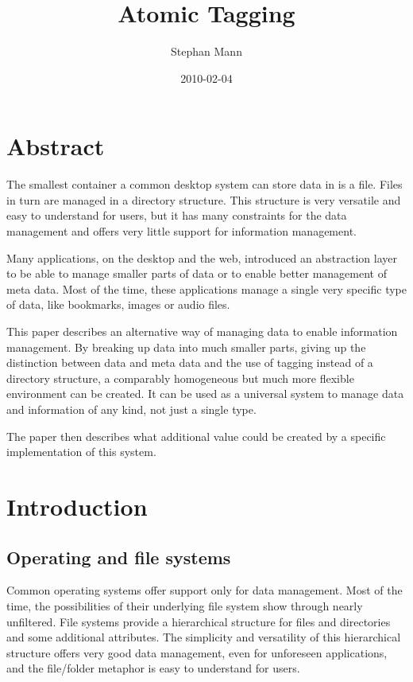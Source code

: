 \documentclass[12pt,a4paper,notitlepage,twocolumn,oneside]{article}
\author{Stephan Mann}
\title{Atomic Tagging}
\date{2010-02-04}
\begin{document}
\maketitle



\section*{Abstract}
The smallest container a common desktop system can store data in is a file. Files in turn are managed in a directory structure. This structure is very versatile and easy to understand for users, but it has many constraints for the data management and offers very little support for information management. 

Many applications, on the desktop and the web, introduced an abstraction layer to be able to manage smaller parts of data or to enable better management of meta data. Most of the time, these applications manage a single very specific type of data, like bookmarks, images or audio files.

This paper describes an alternative way of managing data to enable information management. By breaking up data into much smaller parts, giving up the distinction between data and meta data and the use of tagging instead of a directory structure, a comparably homogeneous but much more flexible environment can be created. It can be used as a universal system to manage data and information of any kind, not just a single type. 

The paper then describes what additional value could be created by a specific implementation of this system.



\section{Introduction}
\subsection{Operating and file systems}\label{op_file_systems}
Common operating systems offer support only for data management. Most of the time, the possibilities of their underlying file system show through nearly unfiltered. File systems provide a hierarchical structure for files and directories and some additional attributes. The simplicity and versatility of this hierarchical structure offers very good data management, even for unforeseen applications, and the file/folder metaphor is easy to understand for users.
\end{document}
